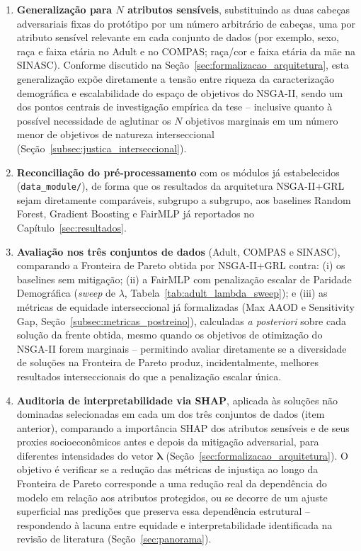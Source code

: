 \begin{enumerate}
    \item \textbf{Generalização para $N$ atributos sensíveis}, substituindo as duas cabeças adversariais fixas do protótipo por um número arbitrário de cabeças, uma por atributo sensível relevante em cada conjunto de dados (por exemplo, sexo, raça e faixa etária no Adult e no COMPAS; raça/cor e faixa etária da mãe na SINASC). Conforme discutido na Seção~\ref{sec:formalizacao_arquitetura}, esta generalização expõe diretamente a tensão entre riqueza da caracterização demográfica e escalabilidade do espaço de objetivos do NSGA-II, sendo um dos pontos centrais de investigação empírica da tese -- inclusive quanto à possível necessidade de aglutinar os $N$ objetivos marginais em um número menor de objetivos de natureza interseccional (Seção~\ref{subsec:justica_interseccional}).
    \item \textbf{Reconciliação do pré-processamento} com os módulos já estabelecidos (\texttt{data\_module/}), de forma que os resultados da arquitetura NSGA-II+GRL sejam diretamente comparáveis, subgrupo a subgrupo, aos baselines Random Forest, Gradient Boosting e FairMLP já reportados no Capítulo~\ref{sec:resultados}.
    \item \textbf{Avaliação nos três conjuntos de dados} (Adult, COMPAS e SINASC), comparando a Fronteira de Pareto obtida por NSGA-II+GRL contra: (i) os baselines sem mitigação; (ii) a FairMLP com penalização escalar de Paridade Demográfica (\textit{sweep} de $\lambda$, Tabela~\ref{tab:adult_lambda_sweep}); e (iii) as métricas de equidade interseccional já formalizadas (Max AAOD e Sensitivity Gap, Seção~\ref{subsec:metricas_postreino}), calculadas \textit{a posteriori} sobre cada solução da frente obtida, mesmo quando os objetivos de otimização do NSGA-II forem marginais -- permitindo avaliar diretamente se a diversidade de soluções na Fronteira de Pareto produz, incidentalmente, melhores resultados interseccionais do que a penalização escalar única.
    \item \textbf{Auditoria de interpretabilidade via SHAP}, aplicada às soluções não dominadas selecionadas em cada um dos três conjuntos de dados (item anterior), comparando a importância SHAP dos atributos sensíveis e de seus proxies socioeconômicos antes e depois da mitigação adversarial, para diferentes intensidades do vetor $\boldsymbol{\lambda}$ (Seção~\ref{sec:formalizacao_arquitetura}). O objetivo é verificar se a redução das métricas de injustiça ao longo da Fronteira de Pareto corresponde a uma redução real da dependência do modelo em relação aos atributos protegidos, ou se decorre de um ajuste superficial nas predições que preserva essa dependência estrutural -- respondendo à lacuna entre equidade e interpretabilidade identificada na revisão de literatura (Seção~\ref{sec:panorama}).
\end{enumerate}

